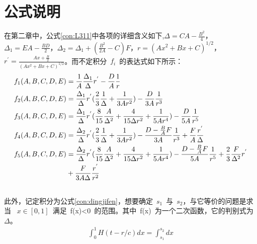 
 \chapter{公式说明}
 
  在第二章中，公式\ref{con:L311}中各项的详细含义如下,$\Delta = CA-\frac{B^{2}}{4}$，$\Delta_{1}=EA-\frac{BD}{2}$，$\Delta_{2} = \Delta_{1} + (\frac{B^{2}}{2A}-C)F$，$r=(Ax^2+Bx+C)^{1/2} $，$r^{'} = \frac{Ax+\frac{B}{2}}{(Ax^2+Bx+C)^{1/2}}$。而不定积分~$f_{i}$~的表达式如下所示：
        \begin{align}
            f_{1}(A,B,C,D,E) &= \frac{1}{A} \frac{\Delta_{1}}{\Delta}r^{'}-\frac{D}{A} \frac{1}{r}
            \\
            f_{2}(A,B,C,D,E) &= \frac{\Delta_{1}}{\Delta}r^{'}(\frac{2}{3}\frac{1}{\Delta}+\frac{1}{3Ar^{2}})-\frac{D}{3A}\frac{1}{r^{3}}\\
            f_{3}(A,B,C,D,E) &=\frac{\Delta_{1}}{\Delta}r^{'}(\frac{8}{15}\frac{A}{\Delta^{2}}+\frac{4}{15\Delta r^{2}}+\frac{1}{5Ar^{4}})-\frac{D}{5A}\frac{1}{r^{5}} \\
            f_{4}(A,B,C,D,E) &= \frac{\Delta_{2}}{\Delta}r^{'}(\frac{2}{3}\frac{1}{\Delta}+\frac{1}{3Ar^{2}})-\frac{D-\frac{B}{A}F}{3A}\frac{1}{r^{3}}+\frac{F}{A}\frac{r^{'}}{\Delta}\\ \notag
            f_{5}(A,B,C,D,E) &= \frac{\Delta_{2}}{\Delta}r^{'}(\frac{8}{15}\frac{A}{\Delta^{2}}+\frac{4}{15\Delta r^{2}}+\frac{1}{5Ar^{4}})-\frac{D-\frac{B}{A}F}{5A}\frac{1}{r^{5}} + \frac{2}{3}\frac{F}{\Delta^{2}}r^{'} \\ 
            &+ \frac{F}{3A\Delta}\frac{r^{'}}{r^{2}}\\  \notag
        \end{align}
    \indent 此外，记定积分为公式\ref{con:dingjifen}，想要确定~$s_1$~与~$s_2$，与它等价的问题是求当 ~$x \in [0,1]$~满足~f(x)<0~的范围。其中~f(x)~为一个二次函数，它的判别式为$\Delta$。 
    \begin{align} \label{con:dingjifen}
        \int_{0}^{1}H(t-r/c)dx=\int_{s_{1}}^{s_{2}} dx
    \end{align}
    
